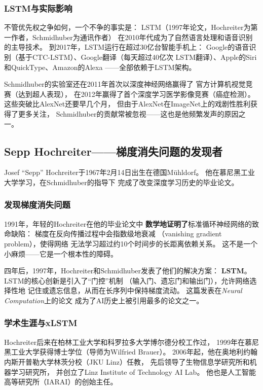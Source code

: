 \subsubsection{LSTM与实际影响}
不管优先权之争如何，一个不争的事实是：
LSTM（1997年论文，Hochreiter为第一作者，Schmidhuber为通讯作者）
在2010年代成为了自然语言处理和语音识别的主导技术。
到2017年，LSTM运行在超过30亿台智能手机上：
Google的语音识别（基于CTC-LSTM）、Google翻译（每天超过40亿次
LSTM翻译）、Apple的Siri和QuickType、Amazon的Alexa
——全部依赖于LSTM架构。

Schmidhuber的实验室还在2011年首次以深度神经网络赢得了
官方计算机视觉竞赛（达到超人表现），
在2012年赢得了首个深度学习医学影像竞赛（癌症检测）。
这些突破比AlexNet还要早几个月，
但由于AlexNet在ImageNet上的戏剧性胜利获得了更多关注，
Schmidhuber的贡献常被忽视——这也是他频繁发声的原因之一。

\bigskip

\subsection{Sepp Hochreiter——梯度消失问题的发现者}
\label{sec:hochreiter}

Josef ``Sepp'' Hochreiter于1967年2月14日出生在德国M\"{u}hldorf。
他在慕尼黑工业大学学习，在Schmidhuber的指导下
完成了改变深度学习历史的毕业论文。

\subsubsection{发现梯度消失问题}
1991年，年轻的Hochreiter在他的毕业论文中
\textbf{数学地证明了}标准循环神经网络的致命缺陷：
梯度在反向传播过程中会指数级地衰减
（vanishing gradient problem），使得网络
无法学习超过约10个时间步的长距离依赖关系。
这不是一个小麻烦——它是一个根本性的障碍。

四年后，1997年，Hochreiter和Schmidhuber发表了他们的解决方案：
\textbf{LSTM}。LSTM的核心创新是引入了``门控''机制
（输入门、遗忘门和输出门），允许网络选择性地
记住或遗忘信息，从而在长序列中保持梯度流动。
这篇发表在\textit{Neural Computation}上的论文
成为了AI历史上被引用最多的论文之一。

\subsubsection{学术生涯与xLSTM}
Hochreiter后来在柏林工业大学和科罗拉多大学博尔德分校工作过，
1999年在慕尼黑工业大学获得博士学位（导师为Wilfried Brauer）。
2006年起，他在奥地利约翰内斯开普勒大学林茨分校（JKU Linz）任教，
先后领导了生物信息学研究所和机器学习研究所，
并创立了Linz Institute of Technology AI Lab。
他也是人工智能高等研究所（IARAI）的创始主任。

